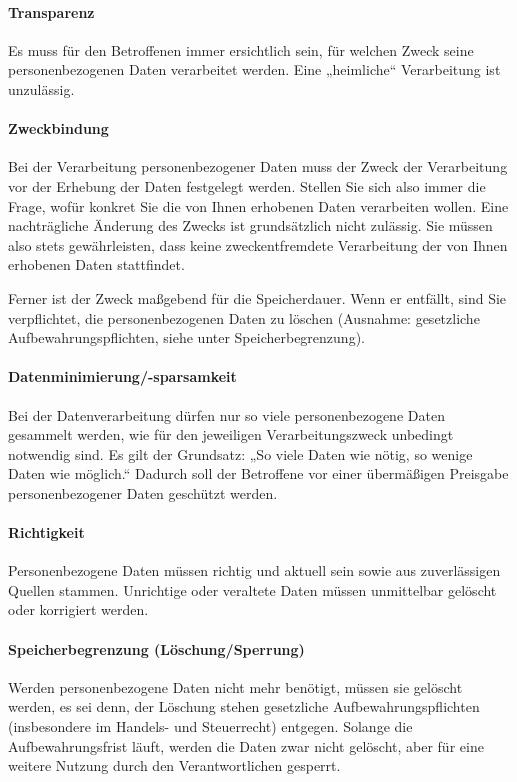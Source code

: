 \paragraph{Transparenz} Es muss für den Betroffenen immer ersichtlich sein, für welchen Zweck seine personenbezogenen Daten verarbeitet werden. Eine „heimliche“ Verarbeitung ist unzulässig.

\paragraph{Zweckbindung} Bei der Verarbeitung personenbezogener Daten muss der Zweck der Verarbeitung vor der Erhebung der Daten festgelegt werden. Stellen Sie sich also immer die Frage, wofür konkret Sie die von Ihnen erhobenen Daten verarbeiten wollen. Eine nachträgliche Änderung des Zwecks ist grundsätzlich nicht zulässig. Sie müssen also stets gewährleisten, dass keine zweckentfremdete Verarbeitung der von Ihnen erhobenen Daten stattfindet.

Ferner ist der Zweck maßgebend für die Speicherdauer. Wenn er entfällt, sind Sie verpflichtet, die personenbezogenen Daten zu löschen (Ausnahme: gesetzliche Aufbewahrungspflichten, siehe unter Speicherbegrenzung).

\paragraph{Datenminimierung/-sparsamkeit} Bei der Datenverarbeitung dürfen nur so viele personenbezogene Daten gesammelt werden, wie für den jeweiligen Verarbeitungszweck unbedingt notwendig sind. Es gilt der Grundsatz: „So viele Daten wie nötig, so wenige Daten wie möglich.“ Dadurch soll der Betroffene vor einer übermäßigen Preisgabe personenbezogener Daten geschützt werden.

\paragraph{Richtigkeit} Personenbezogene Daten müssen richtig und aktuell sein sowie aus zuverlässigen Quellen stammen. Unrichtige oder veraltete Daten müssen unmittelbar gelöscht oder korrigiert werden.

\paragraph{Speicherbegrenzung (Löschung/Sperrung)} Werden personenbezogene Daten nicht mehr benötigt, müssen sie gelöscht werden, es sei denn, der Löschung stehen gesetzliche Aufbewahrungspflichten (insbesondere im Handels- und Steuerrecht) entgegen. Solange die Aufbewahrungsfrist läuft, werden die Daten zwar nicht gelöscht, aber für eine weitere Nutzung durch den Verantwortlichen gesperrt.

